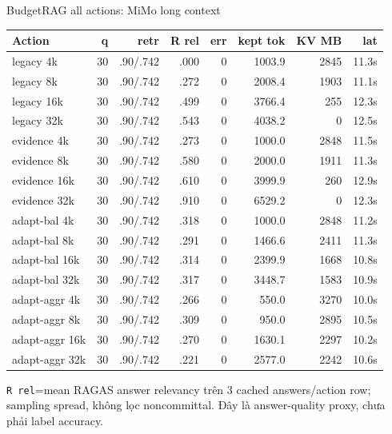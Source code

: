\documentclass[aspectratio=169,10pt]{beamer}
\newcommand{\smallcode}[1]{\texttt{\scriptsize #1}}
\newcommand{\takeaway}[1]{%
  \vspace{0.46em}
  \noindent\colorbox{Soft}{%
    \parbox{\dimexpr\linewidth-2\fboxsep}{\color{Ink}\strut #1\strut}%
  }%
}
\begin{document}
\begin{frame}{BudgetRAG all actions: MiMo long context}
  \tiny
  \setlength{\tabcolsep}{2.6pt}
  \renewcommand{\arraystretch}{1.06}
  \begin{tabular}{>{\raggedright\arraybackslash}p{}r r r r r r r}
    \toprule
    Action & q & retr & R rel & err & kept tok & KV MB & lat \\
    \midrule
    legacy 4k & 30 & .90/.742 & .000 & 0 & 1003.9 & 2845 & 11.3s \\
    legacy 8k & 30 & .90/.742 & .272 & 0 & 2008.4 & 1903 & 11.1s \\
    legacy 16k & 30 & .90/.742 & .499 & 0 & 3766.4 & 255 & 12.3s \\
    legacy 32k & 30 & .90/.742 & .543 & 0 & 4038.2 & 0 & 12.5s \\
    evidence 4k & 30 & .90/.742 & .273 & 0 & 1000.0 & 2848 & 11.5s \\
    evidence 8k & 30 & .90/.742 & .580 & 0 & 2000.0 & 1911 & 11.3s \\
    evidence 16k & 30 & .90/.742 & .610 & 0 & 3999.9 & 260 & 12.9s \\
    evidence 32k & 30 & .90/.742 & .910 & 0 & 6529.2 & 0 & 12.3s \\
    adapt-bal 4k & 30 & .90/.742 & .318 & 0 & 1000.0 & 2848 & 11.2s \\
    adapt-bal 8k & 30 & .90/.742 & .291 & 0 & 1466.6 & 2411 & 11.3s \\
    adapt-bal 16k & 30 & .90/.742 & .314 & 0 & 2399.9 & 1668 & 10.8s \\
    adapt-bal 32k & 30 & .90/.742 & .317 & 0 & 3448.7 & 1583 & 10.9s \\
    adapt-aggr 4k & 30 & .90/.742 & .266 & 0 & 550.0 & 3270 & 10.0s \\
    adapt-aggr 8k & 30 & .90/.742 & .309 & 0 & 950.0 & 2895 & 10.5s \\
    adapt-aggr 16k & 30 & .90/.742 & .270 & 0 & 1630.1 & 2297 & 10.2s \\
    adapt-aggr 32k & 30 & .90/.742 & .221 & 0 & 2577.0 & 2242 & 10.6s \\
    \bottomrule
  \end{tabular}
  \vspace{0.16cm}
  \takeaway{\scriptsize \smallcode{R rel}=mean RAGAS answer relevancy trên 3 cached answers/action row; sampling spread, không lọc noncommittal. Đây là answer-quality proxy, chưa phải label accuracy.}
\end{frame}
\end{document}
